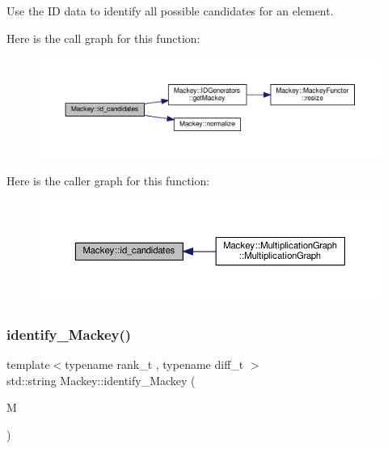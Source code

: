 Use the ID data to identify all possible candidates for an element. 

Here is the call graph for this function\+:\nopagebreak
\begin{figure}[H]
\begin{center}
\leavevmode
\includegraphics[width=350pt]{namespaceMackey_a83ac78e6d1695af40d0fa58af5255e84_cgraph}
\end{center}
\end{figure}
Here is the caller graph for this function\+:\nopagebreak
\begin{figure}[H]
\begin{center}
\leavevmode
\includegraphics[width=350pt]{namespaceMackey_a83ac78e6d1695af40d0fa58af5255e84_icgraph}
\end{center}
\end{figure}
\mbox{\label{namespaceMackey_ad0ca46ae450950b13360c44a2de1cb43}} 
\subsubsection{\texorpdfstring{identify\+\_\+\+Mackey()}{identify\_Mackey()}}
{\footnotesize\ttfamily template$<$typename rank\+\_\+t , typename diff\+\_\+t $>$ \\
std\+::string Mackey\+::identify\+\_\+\+Mackey (\begin{DoxyParamCaption}\item[{\hyperlink{classMackey_1_1MackeyFunctor}{Mackey\+Functor}$<$ rank\+\_\+t $>$ \&}]{M }\end{DoxyParamCaption})}



